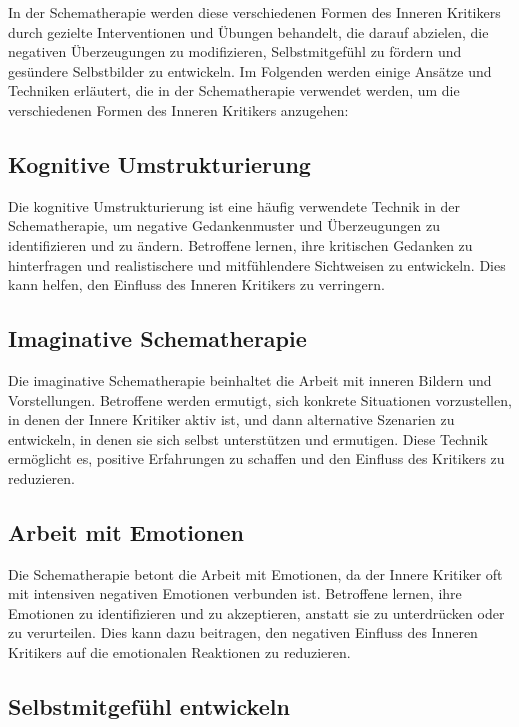 In der Schematherapie werden diese verschiedenen Formen des Inneren Kritikers durch gezielte Interventionen und Übungen behandelt, die darauf abzielen, die negativen Überzeugungen zu modifizieren, Selbstmitgefühl zu fördern und gesündere Selbstbilder zu entwickeln. Im Folgenden werden einige Ansätze und Techniken erläutert, die in der Schematherapie verwendet werden, um die verschiedenen Formen des Inneren Kritikers anzugehen:

\subsection{Kognitive Umstrukturierung}

Die kognitive Umstrukturierung ist eine häufig verwendete Technik in der Schematherapie, um negative Gedankenmuster und Überzeugungen zu identifizieren und zu ändern. Betroffene lernen, ihre kritischen Gedanken zu hinterfragen und realistischere und mitfühlendere Sichtweisen zu entwickeln. Dies kann helfen, den Einfluss des Inneren Kritikers zu verringern.

\subsection{Imaginative Schematherapie}

Die imaginative Schematherapie beinhaltet die Arbeit mit inneren Bildern und Vorstellungen. Betroffene werden ermutigt, sich konkrete Situationen vorzustellen, in denen der Innere Kritiker aktiv ist, und dann alternative Szenarien zu entwickeln, in denen sie sich selbst unterstützen und ermutigen. Diese Technik ermöglicht es, positive Erfahrungen zu schaffen und den Einfluss des Kritikers zu reduzieren.

\subsection{Arbeit mit Emotionen}

Die Schematherapie betont die Arbeit mit Emotionen, da der Innere Kritiker oft mit intensiven negativen Emotionen verbunden ist. Betroffene lernen, ihre Emotionen zu identifizieren und zu akzeptieren, anstatt sie zu unterdrücken oder zu verurteilen. Dies kann dazu beitragen, den negativen Einfluss des Inneren Kritikers auf die emotionalen Reaktionen zu reduzieren.

\subsection{Selbstmitgefühl entwickeln}

